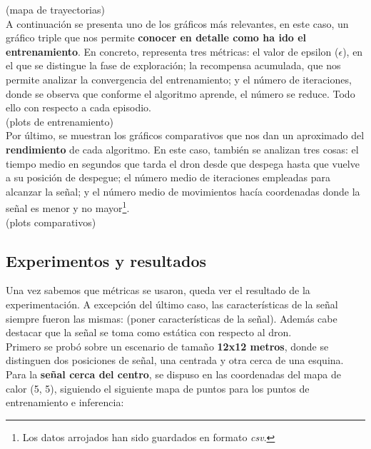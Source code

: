 (mapa de trayectorias)\\

A continuación se presenta uno de los gráficos más relevantes, en este caso, un gráfico triple que nos permite \textbf{conocer en detalle como ha ido el entrenamiento}. En concreto, representa tres métricas: el valor de epsilon ($\epsilon$), en el que se distingue la fase de exploración; la recompensa acumulada, que nos permite analizar la convergencia del entrenamiento; y el número de iteraciones, donde se observa que conforme el algoritmo aprende, el número se reduce. Todo ello con respecto a cada episodio.\\

(plots de entrenamiento)\\

Por último, se muestran los gráficos comparativos que nos dan un aproximado del \textbf{rendimiento} de cada algoritmo. En este caso, también se analizan tres cosas: el tiempo medio en segundos que tarda el dron desde que despega hasta que vuelve a su posición de despegue; el número medio de iteraciones empleadas para alcanzar la señal; y el número medio de movimientos hacía coordenadas donde la señal es menor y no mayor\footnote[4]{Los datos arrojados han sido guardados en formato \emph{csv}.}.\\

(plots comparativos)\\

\subsection{Experimentos y resultados}
\label{subsec:experimentos_resultados}

Una vez sabemos que métricas se usaron, queda ver el resultado de la experimentación. A excepción del último caso, las características de la señal siempre fueron las mismas: (poner características de la señal). Además cabe destacar que la señal se toma como estática con respecto al dron.\\

Primero se probó sobre un escenario de tamaño \textbf{12x12 metros}, donde se distinguen dos posiciones de señal, una centrada y otra cerca de una esquina.\\

Para la \textbf{señal cerca del centro}, se dispuso en las coordenadas del mapa de calor (5, 5), siguiendo el siguiente mapa de puntos para los puntos de entrenamiento e inferencia:\\


